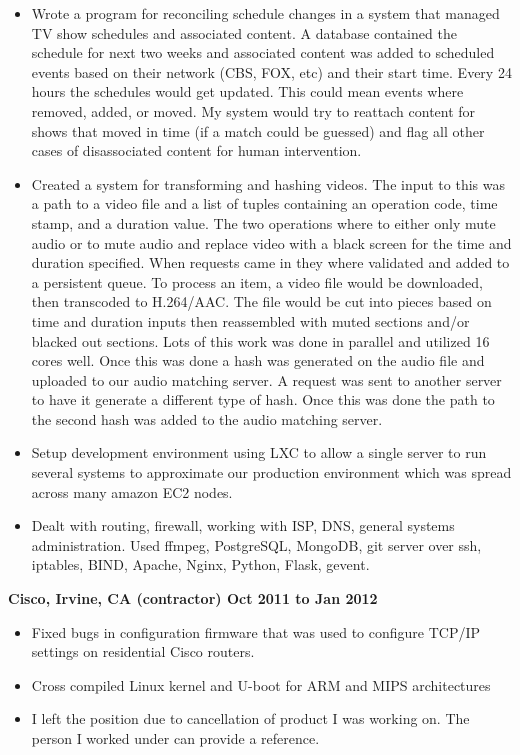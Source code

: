 \documentclass{res}
\begin{document}
\begin{resume}
\begin{itemize}
\item
	Wrote a program for reconciling schedule changes in a system
	that managed TV show schedules and associated content.	A database
	contained the schedule for next two weeks and associated content
	was added to scheduled events based on their network (CBS, FOX,
	etc) and their start time.  Every 24 hours the schedules would
	get updated.  This could mean events where removed, added,
	or moved.  My system would try to reattach content for shows
	that moved in time (if a match could be guessed) and flag all
	other cases of disassociated content for human intervention.
\item
	Created a system for transforming and hashing videos.  The
	input to this was a path to a video file and a list of tuples
	containing an operation code, time stamp, and a duration value.
	The two operations where to either only mute audio or to mute
	audio and replace video with a black screen for the time and
	duration specified.  When requests came in they where validated
	and added to a persistent queue.  To process an item, a video
	file would be downloaded, then transcoded to H.264/AAC.  The file
	would be cut into pieces based on time and duration inputs then
	reassembled with muted sections and/or blacked out sections.
	Lots of this work was done in parallel and utilized 16 cores well.
	Once this was done a hash was generated on the audio file and
	uploaded to our audio matching server.	A request was sent to
	another server to have it generate a different type of hash.
	Once this was done the path to the second hash was added to the
	audio matching server.

\item
	Setup  development  environment using LXC to allow a single
	server to run several systems to approximate our production
	environment which was spread across many amazon EC2 nodes.

\item
	Dealt with routing, firewall, working with ISP, DNS, general
	systems administration.  Used ffmpeg, PostgreSQL, MongoDB,
	git server over ssh, iptables, BIND, Apache, Nginx, Python,
	Flask, gevent.

\end{itemize}

{\large \bf Cisco, Irvine, CA (contractor) \hfill Oct 2011 to Jan 2012}

\begin{itemize}

\item
	Fixed bugs in configuration firmware that was used to configure
	TCP/IP settings on residential Cisco routers.
\item
	Cross compiled Linux kernel and U-boot for ARM and MIPS
	architectures
\item
	I left the position due to cancellation of product I was
	working on.  The person I worked under can provide a
	reference.


\end{itemize}
\end{resume}
\end{document}

